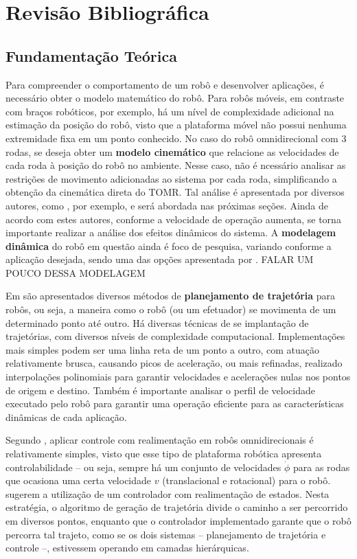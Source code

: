 \section{Revisão Bibliográfica}
\label{sec:revbib}

\subsection{Fundamentação Teórica}

Para compreender o comportamento de um robô e desenvolver aplicações, é necessário obter o modelo matemático do robô. Para robôs móveis, em contraste com braços robóticos, por exemplo, há um nível de complexidade adicional na estimação da posição do robô, visto que a plataforma móvel não possui nenhuma extremidade fixa em um ponto conhecido. No caso do robô omnidirecional com 3 rodas, se deseja obter um \textbf{modelo cinemático} que relacione as velocidades de cada roda à posição do robô no ambiente. Nesse caso, não é ncessário analisar as restrições de movimento adicionadas ao sistema por cada roda, simplificando a obtenção da cinemática direta do TOMR. Tal análise é apresentada por diversos autores, como \cite{siegwart2011introduction}, por exemplo, e será abordada nas próximas seções. Ainda de acordo com estes autores, conforme a velocidade de operação aumenta, se torna importante realizar a análise dos efeitos dinâmicos do sistema. A \textbf{modelagem dinâmica} do robô em questão ainda é foco de pesquisa, variando conforme a aplicação desejada, sendo uma das opções apresentada por \cite{kim2014minenergy}. FALAR UM POUCO DESSA MODELAGEM

Em \cite{lynch2017modern} são apresentados diversos métodos de \textbf{planejamento de trajetória} para robôs, ou seja, a maneira como o robô (ou um efetuador) se movimenta de um determinado ponto até outro. Há diversas técnicas de se implantação de trajetórias, com diversos níveis de complexidade computacional. Implementações mais simples podem ser uma linha reta de um ponto a outro, com atuação relativamente brusca, causando picos de aceleração, ou mais refinadas, realizado interpolações polinomiais para garantir velocidades e acelerações nulas nos pontos de origem e destino. Também é importante analisar o perfil de velocidade executado pelo robô para garantir uma operação eficiente para as características dinâmicas de cada aplicação.

Segundo \cite{lynch2017modern}, aplicar controle com realimentação em robôs omnidirecionais é relativamente simples, visto que esse tipo de plataforma robótica apresenta controlabilidade -- ou seja, sempre há um conjunto de velocidades \textbf{$\dot\phi$} para as rodas que ocasiona uma certa velocidade \textbf{$v$} (translacional e rotacional) para o robô. \cite{siegwart2011introduction} sugerem a utilização de um controlador com realimentação de estados. Nesta estratégia, o algoritmo de geração de trajetória divide o caminho a ser percorrido em diversos pontos, enquanto que o controlador implementado garante que o robô percorra tal trajeto, como se os dois sistemas -- planejamento de trajetória e controle --, estivessem operando em camadas hierárquicas.

